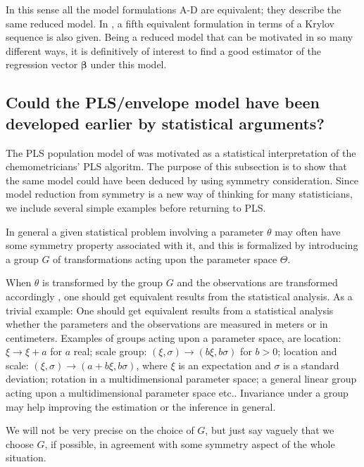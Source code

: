 \documentclass[a4paper, 11pt]{article}
\begin{document}
\bigskip

In this sense all the model formulations A-D are equivalent; they describe the same reduced model. In \citet{cook2013envelopes}, a fifth equivalent formulation in terms
of a Krylov sequence is also given. Being a reduced model that can be motivated in so many different ways, it is definitively of interest to find a good estimator of the regression vector $\bm{\beta}$ under this model.

\bigskip

\subsection{Could the PLS/envelope model have been developed earlier by statistical arguments?}

The PLS population model of \citet{helland1990partial} was motivated as a statistical interpretation of the chemometricians' PLS algoritm. The purpose of this subsection is to show that the same model could have been deduced by using symmetry consideration. Since model reduction from symmetry is a new way of thinking for many statisticians, we include several simple examples before returning to PLS.

In general a given statistical problem involving a parameter $\theta$ may often have some symmetry property associated with it, and this is formalized by introducing a group $G$ of transformations acting upon the parameter space $\Theta$.

When $\theta$ is transformed by the group $G$ and the observations are transformed accordingly \citep[see][]{helland2004statistical}, one should get equivalent results from the statistical analysis. As a trivial example: One should get equivalent results from a statistical analysis whether the parameters and the observations are measured in meters or in centimeters. Examples of groups acting upon a parameter space, are location: $\xi\rightarrow \xi+a$ for $a$ real; scale group: $(\xi ,\sigma)\rightarrow (b\xi , b\sigma)$ for $b>0$; location and scale: $(\xi,\sigma)\rightarrow(a+b\xi, b\sigma)$, where $\xi$ is an expectation and $\sigma$ is a standard deviation; rotation in a multidimensional parameter space; a general linear group acting upon a multidimensional parameter space etc.. Invariance under a group may help improving the estimation or the inference in general.


We will not be very precise on the choice of $G$, but just say vaguely that we choose $G$, if possible, in agreement with some symmetry aspect of the whole situation.
\end{document}
